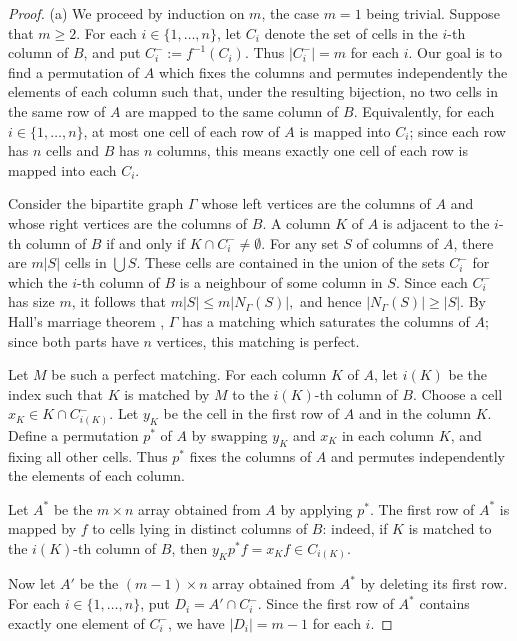 \documentclass[11pt]{article}
\theoremstyle{plain}
\theoremstyle{remark}
\theoremstyle{definition}
\theoremstyle{plain}
\begin{document}
\begin{proof}
	(a) We proceed by induction on $m$, the case $m=1$ being trivial.
	Suppose that $m\ge 2$. For each $i\in\{1,\ldots,n\}$, let $C_i$
	denote the set of cells in the $i$-th column of $B$, and put
\(C_i^-:=f^{-1}(C_i).\)
	Thus $|C_i^-|=m$ for each $i$. Our goal is to find a permutation of $A$
	which fixes the columns and permutes independently the elements of each
	column such that, under the resulting bijection, no two cells in the same
	row of $A$ are mapped to the same column of $B$. Equivalently, for each
	$i\in\{1,\ldots,n\}$, at most one cell of each row of $A$ is mapped into $C_i$;
	since each row has $n$ cells and $B$ has $n$ columns, this means exactly
	one cell of each row is mapped into each $C_i$.

	Consider the bipartite graph $\Gamma$ whose left vertices are the columns of
	$A$ and whose right vertices are the columns of $B$. A column $K$ of $A$
	is adjacent to the $i$-th column of $B$ if and only if
\(K\cap C_i^-\ne\emptyset.\)
	For any set $S$ of columns of $A$, there are $m|S|$ cells in
	$\bigcup S$. These cells are contained in the union of the sets $C_i^-$
	for which the $i$-th column of $B$ is a neighbour of some column in $S$.
	Since each $C_i^-$ has size $m$, it follows that
\(m|S|\le m|N_\Gamma(S)|,\)
	and hence $|N_\Gamma(S)|\ge |S|$. By Hall's marriage theorem \cite[Theorem~1]{Hall}, $\Gamma$ has a
	matching which saturates the columns of $A$; since both parts have $n$
	vertices, this matching is perfect.

	Let $M$ be such a perfect matching. For each column $K$ of $A$, let
	$i(K)$ be the index such that $K$ is matched by $M$ to the $i(K)$-th
	column of $B$. Choose a cell
\(x_K\in K\cap C_{i(K)}^-.\)
	Let $y_K$ be the cell in the first row of $A$ and in the column $K$.
	Define a permutation $p^*$ of $A$ by swapping $y_K$ and $x_K$ in each
	column $K$, and fixing all other cells. Thus $p^*$ fixes the columns of
	$A$ and permutes independently the elements of each column.

	Let $A^*$ be the $m\times n$ array obtained from $A$ by applying $p^*$. The first
	row of $A^*$ is mapped by $f$ to cells lying in distinct columns of $B$:
	indeed, if $K$ is matched to the $i(K)$-th column of $B$, then
\(y_Kp^*f=x_Kf\in C_{i(K)}.\)

	Now let $A'$ be the $(m-1)\times n$ array obtained from $A^*$ by deleting
	its first row. For each $i\in\{1,\ldots,n\}$, put
\(D_i=A'\cap C_i^-.\)
	Since the first row of $A^*$ contains exactly one element of $C_i^-$, we
	have $|D_i|=m-1$ for each $i$.


\end{proof}
\end{document}

